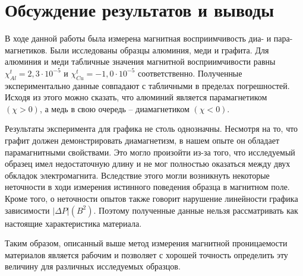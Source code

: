 \documentclass[a4paper,12pt]{article} %
\begin{document}
\section{Обсуждение результатов и выводы}

В ходе данной работы была измерена магнитная восприимчивость диа- и пара- магнетиков. Были исследованы образцы алюминия, меди и графита. Для алюминия и меди табличные значения магнитной восприимчивости равны \underline{$ \chi_{Al}^t = 2,3 \cdot 10^{-5} $} и \underline{$ \chi_{Cu}^t = -1,0 \cdot 10^{-5} $} соответственно. Полученные экспериментально данные совпадают с табличными в пределах погрешностей. Исходя из этого можно сказать, что алюминий является парамагнетиком $ (\chi > 0) $, а медь в свою очередь -- диамагнетиком $ (\chi < 0) $.


Результаты эксперимента для графика не столь однозначны. Несмотря на то, что графит должен демонстрировать диамагнетизм, в нашем опыте он обладает парамагнитными свойствами. Это могло произойти из-за того, что исследуемый образец имел недостаточную длину и не мог полностью оказаться между двух обкладок электромагнита. Вследствие этого могли возникнуть некоторые неточности в ходи измерения истинного поведения образца в магнитном поле. Кроме того, о неточности опытов также говорит нарушение линейности графика зависимости $ |\Delta P|(B^2) $. Поэтому полученные данные нельзя рассматривать как настоящие характеристика материала.


Таким образом, описанный выше метод измерения магнитной проницаемости материалов является рабочим и позволяет с хорошей точность определить эту величину для различных исследуемых образцов.
\end{document}
